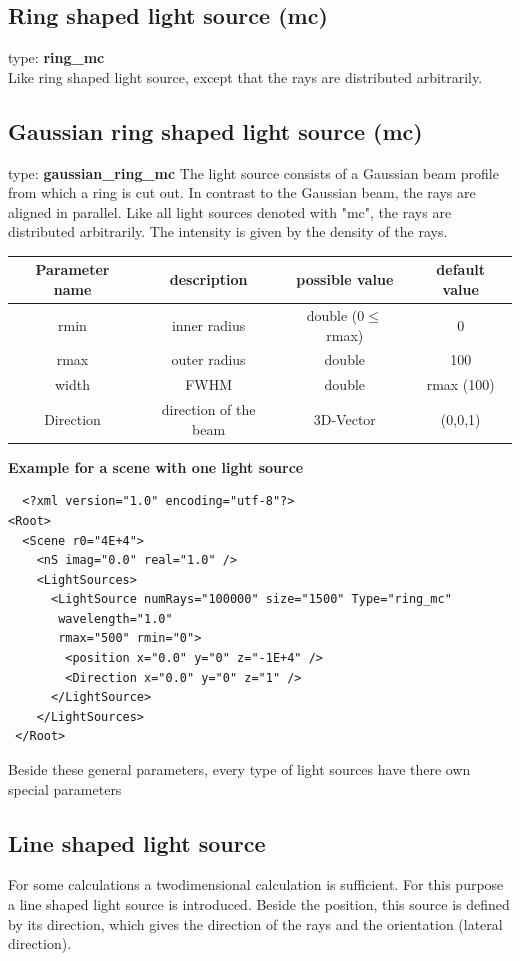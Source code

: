 \documentclass[a4paper,html,11pt,openany]{book}
\begin{document}
\subsection{Ring shaped light source (mc)}
 type: \textbf{ring\_mc} \\
Like ring shaped light source, except that the rays are distributed arbitrarily. 
 \subsection{Gaussian ring shaped light source (mc)}
type: \textbf{gaussian\_ring\_mc}
The light source consists of a Gaussian beam profile from which a ring is cut out. In contrast to the Gaussian beam, the rays are aligned in parallel.
Like all light sources denoted with "mc", the rays are distributed arbitrarily. The intensity is given by the density of the rays. 

\vspace{1em}
 \begin{tabular}{c|c|c|c}
 Parameter name & description  & possible value & default value\\
 \hline
 rmin  & inner radius & double ($0\le$ rmax) & 0 \\
 \hline 
 rmax & outer radius & double & 100 \\
 \hline 
 width & FWHM & double & rmax (100) \\
 \hline
 Direction & direction of the beam & 3D-Vector & (0,0,1) \\ 
\end{tabular}
 
\vspace{1em} 
 \textbf{Example for a scene with one light source}
 \lstset{language=XML}
 \begin{lstlisting}
  <?xml version="1.0" encoding="utf-8"?>
<Root>
  <Scene r0="4E+4">
    <nS imag="0.0" real="1.0" />
    <LightSources>
      <LightSource numRays="100000" size="1500" Type="ring_mc"
       wavelength="1.0"
       rmax="500" rmin="0">
        <position x="0.0" y="0" z="-1E+4" />
        <Direction x="0.0" y="0" z="1" />
      </LightSource>
    </LightSources>
 </Root>
 \end{lstlisting}
 Beside these general parameters, every type of light sources have there own special parameters

\subsection{Line shaped light source}
For some calculations a twodimensional calculation is sufficient. For this purpose a line shaped light source is introduced. Beside the position, this source is defined by its direction, which gives the direction of the rays and the orientation (lateral direction). 
\end{document}
